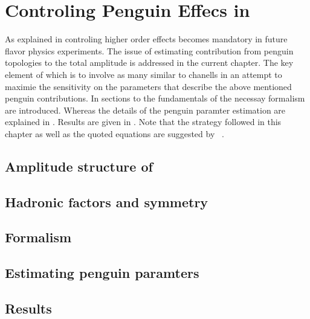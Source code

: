 
\chapter{Controling Penguin Effecs in \phis}
\label{Penguins}

As explained in  controling higher order effects becomes mandatory in
future flavor physics experiments. The issue of estimating contribution from penguin topologies
to the total \BsJpsiPhi amplitude is addressed in the current chapter. The key element of which
is to involve as many similar to \BsJpsiPhi chanells in an attempt to maximie the sensitivity on
the parameters that describe the above mentioned penguin contributions. In sections 
to  the fundamentals of the necessay formalism are introduced.
Whereas the details of the penguin paramter estimation are explained in .
Results are given in . Note that the strategy followed in this chapter
as well as the quoted equations are suggested by ~\cite{Fleischer:1999zi,Faller:2008gt,DeBruyn:2014oga}. 

\section{Amplitude structure of \BsJpsiPhi}
\label{jpsiphi_amp_struct}


\section{Hadronic factors and \grpsuthree symmetry}
\label{had_pars_suthree}


\section{Formalism}
\label{penguin_formalism}


\section{Estimating penguin paramters}
\label{penguin_more_chanells}


\section{Results}
\label{penguin_results}

